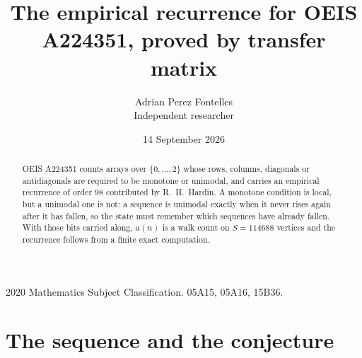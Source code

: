 \documentclass[11pt,a4paper]{article}
\title{The empirical recurrence for OEIS A224351, proved by transfer matrix}
\author{Adrian Perez Fontelles\\ \small Independent researcher}
\date{14 September 2026}
\theoremstyle{plain}
\theoremstyle{definition}
\begin{document}
\maketitle

\begin{abstract}
OEIS A224351 counts arrays over $\{0,\dots,2\}$ whose rows, columns, diagonals or
antidiagonals are required to be monotone or unimodal, and carries an empirical recurrence of
order $98$ contributed by R.~H.~Hardin. A monotone condition is local, but a unimodal one
is not: a sequence is unimodal exactly when it never rises again after it has fallen, so the
state must remember which sequences have already fallen. With those bits carried along, $a(n)$
is a walk count on $S=114688$ vertices and the recurrence follows from a finite exact
computation.
\end{abstract}

\noindent\small 2020 Mathematics Subject Classification. 05A15, 05A16, 15B36.\normalsize

\section{The sequence and the conjecture}
\end{document}
